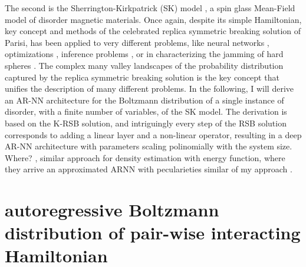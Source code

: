 \documentclass[aps,physrev,10pt,floatfix,reprint]{revtex4-2}
\begin{document}
The second is the Sherrington-Kirkpatrick (SK) model \cite{PhysRevLett.35.1792}, a spin glass Mean-Field model of disorder magnetic materials. Once again, despite its simple Hamiltonian, key concept and methods of the celebrated \cite{Nobel2021} replica symmetric breaking solution \cite{PARISI1979203, PhysRevLett.43.1754} of Parisi, has been applied to very different problems, like neural networks \cite{Gardner_1987, PhysRevLett.55.1530}, optimizations \cite{doi:10.1126/science.1073287}, inference problems \cite{doi:10.1080/00018732.2016.1211393}, or in characterizing the jamming of hard spheres \cite{RevModPhys.82.789, PhysRevLett.102.195701}. The complex many valley landscapes of the probability distribution captured by the replica symmetric breaking solution is the key concept that unifies the description of many different problems. In the following, I will derive an AR-NN architecture for the Boltzmann distribution of a single instance of disorder, with a finite number of variables, of the SK model. The derivation is based on the K-RSB solution, and intriguingly every step of the RSB solution corresponds to adding a linear layer and a non-linear operator, resulting in a deep AR-NN architecture with parameters scaling polinomially with the system size. 
Where?
\cite{Carleo2018},
similar approach for density estimation with energy function, where they arrive an approximated ARNN with pecularieties similar of my approach \cite{pmlr-v80-huang18d}.
            
\section{autoregressive Boltzmann distribution of pair-wise interacting Hamiltonian}
\end{document}
